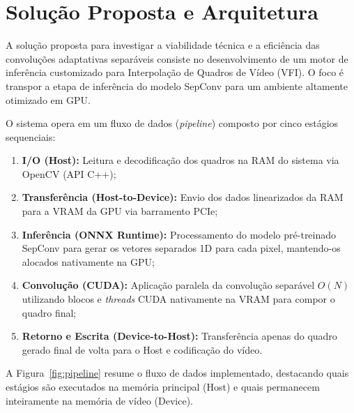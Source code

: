 \documentclass[
    12pt,                %
    openright,           %
    oneside,             %
    a4paper,             %
    english,             %
    brazil               %
]{abntex2}
\begin{document}
\section{Solução Proposta e Arquitetura}
\label{sec:solucao}

A solução proposta para investigar a viabilidade técnica e a eficiência das convoluções adaptativas separáveis consiste no desenvolvimento de um motor de inferência customizado para Interpolação de Quadros de Vídeo (VFI). O foco é transpor a etapa de inferência do modelo SepConv para um ambiente altamente otimizado em GPU.

O sistema opera em um fluxo de dados (\textit{pipeline}) composto por cinco estágios sequenciais:

\begin{enumerate}
    \item \textbf{I/O (Host):} Leitura e decodificação dos quadros na RAM do sistema via OpenCV (API C++);
    \item \textbf{Transferência (Host-to-Device):} Envio dos dados linearizados da RAM para a VRAM da GPU via barramento PCIe;
    \item \textbf{Inferência (ONNX Runtime):} Processamento do modelo pré-treinado SepConv para gerar os vetores separados 1D para cada pixel, mantendo-os alocados nativamente na GPU;
    \item \textbf{Convolução (CUDA):} Aplicação paralela da convolução separável $O(N)$ utilizando blocos e \textit{threads} CUDA nativamente na VRAM para compor o quadro final;
    \item \textbf{Retorno e Escrita (Device-to-Host):} Transferência apenas do quadro gerado final de volta para o Host e codificação do vídeo.
\end{enumerate}

A Figura~\ref{fig:pipeline} resume o fluxo de dados implementado, destacando quais estágios são executados na memória principal (Host) e quais permanecem inteiramente na memória de vídeo (Device).
\end{document}
